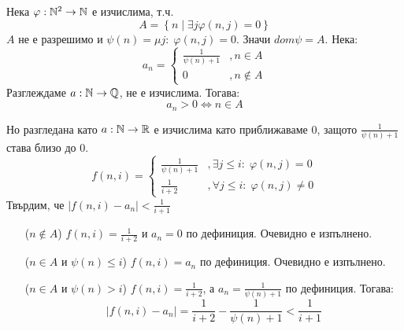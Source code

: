 \begin{example}\label{example:comp-seq-uncomp-members}
    Нека $\varphi: {\mathbb{N}}^2 \to {\mathbb{N}}$ е изчислима, т.ч.
    \begin{equation*}
        A = \left\{ n \mid \exists j \varphi(n,j) = 0 \right\}
    \end{equation*}
    $A$ не е разрешимо и $\psi(n) = \mu j:\; \varphi(n,j) = 0$. Значи $dom\psi = A$. Нека:
    \begin{equation*}
        a_n = \begin{cases}
            \frac{1}{\psi(n) + 1}   &, n \in A \\
            0                       & , n \notin A
        \end{cases}
    \end{equation*}
    Разглеждаме $a: {\mathbb{N}} \to {\mathbb{Q}}$, не е изчислима. Тогава:
    \begin{equation*}
        a_n > 0 \iff n \in A
    \end{equation*}

    Но разгледана като $a: {\mathbb{N}} \to {\mathbb{R}}$ е изчислима като приближаваме 0, защото $\frac{1}{\psi(n) + 1}$ става близо до 0.
    \begin{equation*}
        f(n, i) = \begin{cases}
            \frac{1}{\psi(n) + 1} &, \exists j \leq i:\; \varphi(n,j) = 0 \\
            \frac{1}{i+2} &, \forall j \leq i:\; \varphi(n,j)\neq 0
        \end{cases}
    \end{equation*}
    Твърдим, че $|f(n,i) - a_n| < \frac{1}{i+1}$
    \begin{itemize}
        \item[($n\notin A$)] $f(n,i) = \frac{1}{i+2}$ и $a_n = 0$ по дефиниция. Очевидно е изпълнено.
        \item[($n\in A$ и $\psi(n) \leq i$)] $f(n,i) = a_n$ по дефиниция. Очевидно е изпълнено.
        \item[($n\in A$ и $\psi(n) > i$)] $f(n,i) = \frac{1}{i+2}$, а $a_n = \frac{1}{\psi(n) + 1}$ по дефиниция. Тогава:
        \begin{equation*}
            |f(n, i) - a_n| = \frac{1}{i+2} - \frac{1}{\psi(n) + 1} < \frac{1}{i+1}
        \end{equation*}
    \end{itemize}
\end{example}

